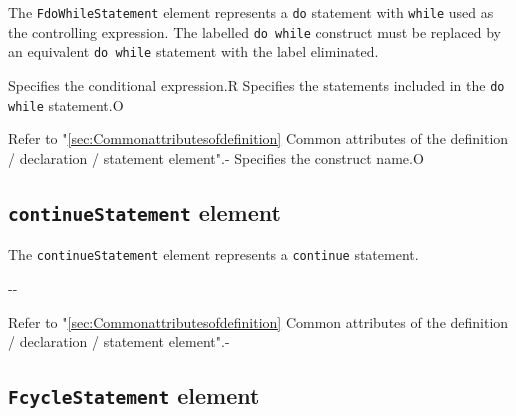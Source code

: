The {\tt FdoWhileStatement} element represents a {\tt do} statement with {\tt while} used as the controlling expression.
The labelled {\tt do while} construct must be replaced by an equivalent {\tt do while} statement with the label eliminated.


\begin{XcodeMLChildElements}
{Specifies the conditional expression.}{R}
{Specifies the statements included in the {\tt do while} statement.}{O}
\end{XcodeMLChildElements}

\begin{XcodeMLAttributes}
{Refer to "\ref{sec:Commonattributesofdefinition} Common attributes of the definition / declaration / statement element".}{-}
{Specifies the construct name.}{O}
\end{XcodeMLAttributes}


\subsection{ {\tt continueStatement} element}

The {\tt continueStatement} element represents a {\tt continue} statement.


\begin{XcodeMLChildElements}
\XcodeMLElementDef{-}
{-}{-}
\end{XcodeMLChildElements}

\begin{XcodeMLAttributes}
{Refer to "\ref{sec:Commonattributesofdefinition} Common attributes of the definition / declaration / statement element".}{-}
\end{XcodeMLAttributes}


\subsection{ {\tt FcycleStatement} element}

